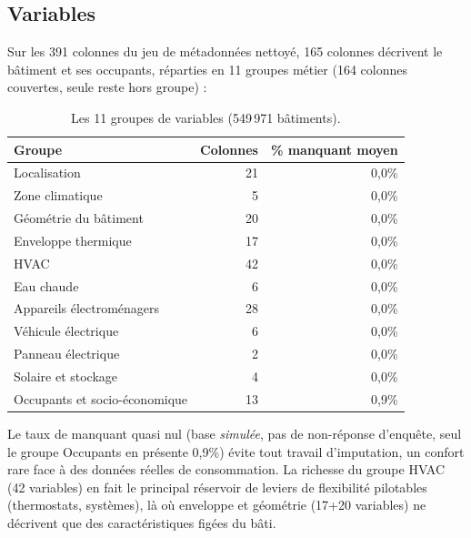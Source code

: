 \subsection{Variables }
\begin{resultbox}
Sur les 391 colonnes du jeu de métadonnées nettoyé, 165 colonnes  décrivent le
bâtiment et ses occupants, réparties en 11 groupes métier (164 colonnes couvertes, seule
 reste hors groupe) :
\begin{table}[H]
\centering
\caption{Les 11 groupes de variables  (549\,971 bâtiments).}
\label{tab:groupes-in}
\begin{tabular}{lrr}
\toprule
Groupe & Colonnes & \% manquant moyen \\
\midrule
Localisation          & 21 & 0,0\% \\
Zone climatique        & 5 & 0,0\% \\
Géométrie du bâtiment  & 20 & 0,0\% \\
Enveloppe thermique    & 17 & 0,0\% \\
HVAC                    & 42 & 0,0\% \\
Eau chaude               & 6 & 0,0\% \\
Appareils électroménagers & 28 & 0,0\% \\
Véhicule électrique      & 6 & 0,0\% \\
Panneau électrique       & 2 & 0,0\% \\
Solaire et stockage      & 4 & 0,0\% \\
Occupants et socio-économique & 13 & 0,9\% \\
\bottomrule
\end{tabular}
\end{table}
Le taux de manquant quasi nul (base \emph{simulée}, pas de non-réponse d'enquête, seul le groupe
Occupants en présente 0,9\%) évite tout travail d'imputation, un confort rare face à des
données réelles de consommation. La richesse du groupe HVAC (42 variables) en fait le principal
réservoir de leviers de flexibilité pilotables (thermostats, systèmes), là où enveloppe et
géométrie (17+20 variables) ne décrivent que des caractéristiques figées du bâti.
\end{resultbox}

